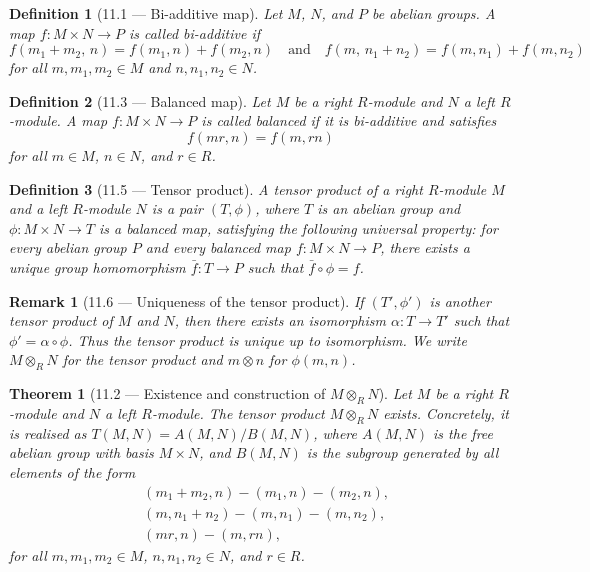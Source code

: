 \documentclass[12pt]{article}
\newtheorem{theorem}{Theorem}
\newtheorem{definition}{Definition}
\newtheorem{remark}{Remark}
\begin{document}
\begin{definition}[11.1 — Bi-additive map]
Let $M$, $N$, and $P$ be abelian groups. A map $f : M \times N \to P$ is called \emph{bi-additive} if
\[
  f(m_1 + m_2,\, n) = f(m_1, n) + f(m_2, n)
  \quad\text{and}\quad
  f(m,\, n_1 + n_2) = f(m, n_1) + f(m, n_2)
\]
for all $m, m_1, m_2 \in M$ and $n, n_1, n_2 \in N$.
\end{definition}

\begin{definition}[11.3 — Balanced map]
Let $M$ be a right $R$-module and $N$ a left $R$-module. A map $f : M \times N \to P$ is called \emph{balanced} if it is bi-additive and satisfies
\[
  f(mr, n) = f(m, rn)
\]
for all $m \in M$, $n \in N$, and $r \in R$.
\end{definition}

\begin{definition}[11.5 — Tensor product]
A \emph{tensor product} of a right $R$-module $M$ and a left $R$-module $N$ is a pair $(T, \phi)$, where $T$ is an abelian group and $\phi : M \times N \to T$ is a balanced map, satisfying the following universal property: for every abelian group $P$ and every balanced map $f : M \times N \to P$, there exists a unique group homomorphism $\bar{f} : T \to P$ such that $\bar{f} \circ \phi = f$.
\end{definition}

\begin{remark}[11.6 — Uniqueness of the tensor product]
If $(T', \phi')$ is another tensor product of $M$ and $N$, then there exists an isomorphism $\alpha : T \to T'$ such that $\phi' = \alpha \circ \phi$. Thus the tensor product is unique up to isomorphism. We write $M \otimes_R N$ for the tensor product and $m \otimes n$ for $\phi(m, n)$.
\end{remark}

\begin{theorem}[{11.2 —  Existence and construction of $M \otimes_R N$}]
Let $M$ be a right $R$-module and $N$ a left $R$-module. The tensor product $M \otimes_R N$ exists. Concretely, it is realised as $T(M,N) = A(M,N)/B(M,N)$, where $A(M,N)$ is the free abelian group with basis $M \times N$, and $B(M,N)$ is the subgroup generated by all elements of the form
\begin{align*}
  &(m_1 + m_2, n) - (m_1, n) - (m_2, n),\\
  &(m, n_1 + n_2) - (m, n_1) - (m, n_2),\\
  &(mr, n) - (m, rn),
\end{align*}
for all $m, m_1, m_2 \in M$, $n, n_1, n_2 \in N$, and $r \in R$.
\end{theorem}
\end{document}
